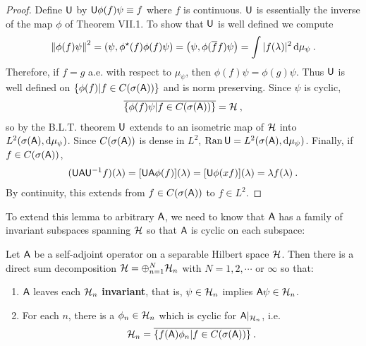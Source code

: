 \begin{proof}
    Define $\mathsf{U}$ by $\mathsf{U} \phi(f) \psi \equiv f$ where $f$ is continuous. $\mathsf{U}$ is essentially the inverse of the map $\phi$ of Theorem VII.1. To show that $\mathsf{U}$ is well defined we compute
    \begin{align}
        \left \Vert \phi(f) \psi \right \Vert^2 = \left( \psi, \phi^\star (f) \phi(f) \psi \right) = \left( \psi, \phi (\overline{f} f) \psi \right) = \int |f(\lambda)|^2 \, \mathrm{d} \mu_\psi \:.
    \end{align}
    Therefore, if $f=g$ a.e. with respect to $\mu_\psi$, then $\phi(f) \psi = \phi(g) \psi$. Thus $\mathsf{U}$ is well defined on $\left \lbrace \phi(f) | f \in C (\sigma (\mathsf{A})) \right \rbrace$ and is norm preserving. Since $\psi$ is cyclic, \begin{align}
        \overline{ \left \lbrace  \phi(f) \psi | f \in C (\sigma (\mathsf{A}))   \right \rbrace } = \mathcal{H} \:,
    \end{align}
    so by the B.L.T. theorem $\mathsf{U}$ extends to an isometric map of $\mathcal{H}$ into $L^{2}(\sigma(\mathsf{A}), \mathrm{d} \mu_\psi)$. Since $C(\sigma (\mathsf{A}))$ is dense in $L^2$, $\mathrm{Ran}\, \mathsf{U} = L^{2}(\sigma(\mathsf{A}), \mathrm{d} \mu_\psi)$. Finally, if $f \in C(\sigma (\mathsf{A}))$, \begin{align}
        (\mathsf{U} \mathsf{A} \mathsf{U}^{-1} f )(\lambda) = [\mathsf{U} \mathsf{A} \phi(f)](\lambda) = [\mathsf{U} \phi(xf)](\lambda) = \lambda f (\lambda) \:.
    \end{align}
    By continuity, this extends from $f \in C(\sigma (\mathsf{A}))$ to $f \in L^2$.
\end{proof}

To extend this lemma to arbitrary $\mathsf{A}$, we need to know that $\mathsf{A}$ has a family of invariant subspaces spanning $\mathcal{H}$ so that $\mathsf{A}$ is cyclic on each subspace:

\begin{lemma}
    Let $\mathsf{A}$ be a self-adjoint operator on a separable Hilbert space $\mathcal{H}$. Then there is a direct sum decomposition $\mathcal{H} = \oplus_{n=1}^N \mathcal{H}_n$ with $N=1,2, \cdots $ or $\infty$ so that:
    \begin{enumerate}
        \item $\mathsf{A}$ leaves each $\mathcal{H}_n$ \textbf{invariant}, that is, $\psi \in \mathcal{H}_n$ implies $\mathsf{A} \psi \in \mathcal{H}_n$.
        \item For each $n$, there is a $\phi_n \in \mathcal{H}_n$ which is cyclic for $\mathsf{A} |_{\mathcal{H}_n}$, i.e.
        \begin{align}
            \mathcal{H}_n = \overline{ \left \lbrace  f(\mathsf{A}) \phi_n | f \in C(\sigma (\mathsf{A}))  \right \rbrace } \:.
        \end{align}
    \end{enumerate} 
\end{lemma}

